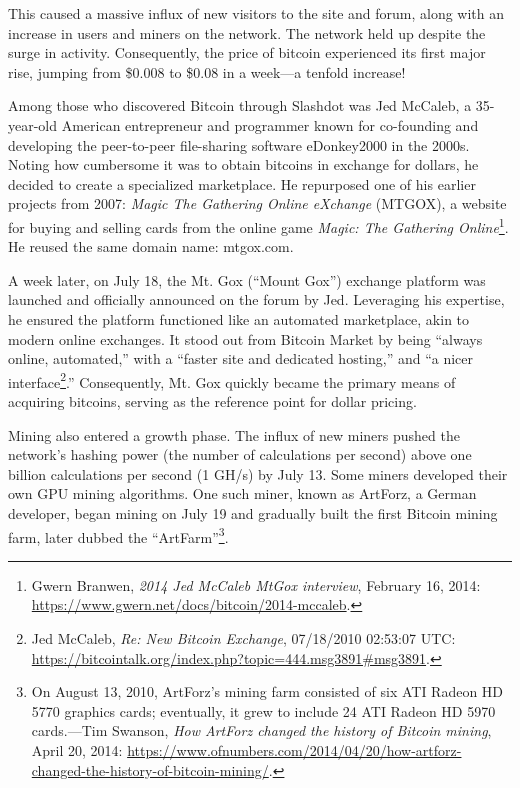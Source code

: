\documentclass[
  a5paper,
  smalldemyvopaper,10pt,twoside,onecolumn,openright,extrafontsizes,hidelinks]{memoir}
\begin{document}
This caused a massive influx of new visitors to the site and forum,
along with an increase in users and miners on the network. The network
held up despite the surge in activity. Consequently, the price of
bitcoin experienced its first major rise, jumping from \$0.008 to \$0.08
in a week---a tenfold increase!

Among those who discovered Bitcoin through Slashdot was Jed McCaleb, a
35-year-old American entrepreneur and programmer known for co-founding
and developing the peer-to-peer file-sharing software eDonkey2000 in the
2000s. Noting how cumbersome it was to obtain bitcoins in exchange for
dollars, he decided to create a specialized marketplace. He repurposed
one of his earlier projects from 2007: \emph{Magic The Gathering Online
eXchange} (MTGOX), a website for buying and selling cards from the
online game \emph{Magic: The Gathering Online}\footnote{Gwern Branwen,
  \emph{2014 Jed McCaleb MtGox interview}, February 16, 2014:
  \url{https://www.gwern.net/docs/bitcoin/2014-mccaleb}.}. He reused the
same domain name: mtgox.com.

A week later, on July 18, the Mt. Gox (``Mount Gox'') exchange platform
was launched and officially announced on the forum by Jed. Leveraging
his expertise, he ensured the platform functioned like an automated
marketplace, akin to modern online exchanges. It stood out from Bitcoin
Market by being ``always online, automated,'' with a ``faster site and
dedicated hosting,'' and ``a nicer interface\footnote{Jed McCaleb,
  \emph{Re: New Bitcoin Exchange}, 07/18/2010 02:53:07 UTC:
  \url{https://bitcointalk.org/index.php?topic=444.msg3891\#msg3891}.}.''
Consequently, Mt. Gox quickly became the primary means of acquiring
bitcoins, serving as the reference point for dollar pricing.

Mining also entered a growth phase. The influx of new miners pushed the
network's hashing power (the number of calculations per second) above
one billion calculations per second (1 GH/s) by July 13. Some miners
developed their own GPU mining algorithms. One such miner, known as
ArtForz, a German developer, began mining on July 19 and gradually built
the first Bitcoin mining farm, later dubbed the ``ArtFarm''\footnote{On
  August 13, 2010, ArtForz's mining farm consisted of six ATI Radeon HD
  5770 graphics cards; eventually, it grew to include 24 ATI Radeon HD
  5970 cards.---Tim Swanson, \emph{How ArtForz changed the history of
  Bitcoin mining}, April 20, 2014:
  \url{https://www.ofnumbers.com/2014/04/20/how-artforz-changed-the-history-of-bitcoin-mining/}.}.
\end{document}
